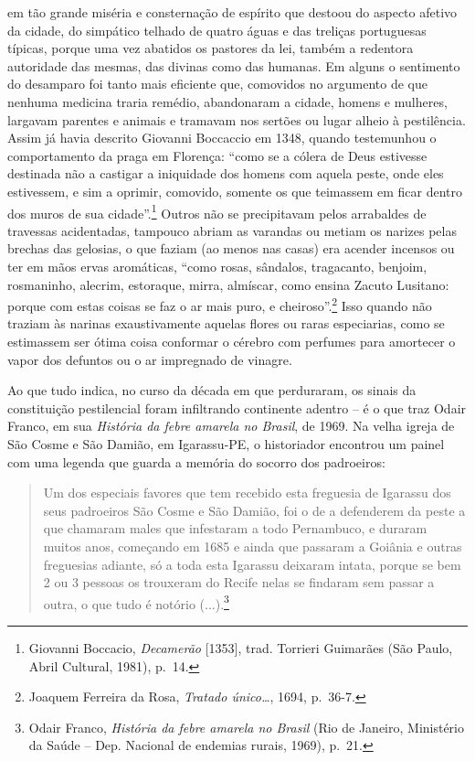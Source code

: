 em tão grande miséria e consternação de espírito que destoou do aspecto
afetivo da cidade, do simpático telhado de quatro águas e das treliças
portuguesas típicas, porque uma vez abatidos os pastores da lei, também
a redentora autoridade das mesmas, das divinas como das humanas. Em
alguns o sentimento do desamparo foi tanto mais eficiente que, comovidos
no argumento de que nenhuma medicina traria remédio, abandonaram a
cidade, homens e mulheres, largavam parentes e animais e tramavam nos
sertões ou lugar alheio à pestilência. Assim já havia descrito Giovanni
Boccaccio em 1348, quando testemunhou o comportamento da praga em
Florença: ``como se a cólera de Deus estivesse destinada não a castigar
a iniquidade dos homens com aquela peste, onde eles estivessem, e sim a
oprimir, comovido, somente os que teimassem em ficar dentro dos muros de
sua cidade''.\footnote{Giovanni Boccacio, \emph{Decamerão} {[}1353{]},
  trad. Torrieri Guimarães (São Paulo, Abril Cultural, 1981), p.~14.}
Outros não se precipitavam pelos arrabaldes de travessas acidentadas,
tampouco abriam as varandas ou metiam os narizes pelas brechas das
gelosias, o que faziam (ao menos nas casas) era acender incensos ou ter
em mãos ervas aromáticas, ``como rosas, sândalos, tragacanto, benjoim,
rosmaninho, alecrim, estoraque, mirra, almíscar, como ensina Zacuto
Lusitano: porque com estas coisas se faz o ar mais puro, e
cheiroso''.\footnote{Joaquem Ferreira da Rosa, \emph{Tratado
  único\ldots{}}, 1694, p.~36-7.} Isso quando não traziam às narinas
exaustivamente aquelas flores ou raras especiarias, como se estimassem
ser ótima coisa conformar o cérebro com perfumes para amortecer o vapor
dos defuntos ou o ar impregnado de vinagre.

Ao que tudo indica, no curso da década em que perduraram, os sinais da
constituição pestilencial foram infiltrando continente adentro -- é o
que traz Odair Franco, em sua \emph{História da febre amarela no
Brasil}, de 1969. Na velha igreja de São Cosme e São Damião, em
Igarassu-PE, o historiador encontrou um painel com uma legenda que
guarda a memória do socorro dos padroeiros:

\begin{quote}
Um dos especiais favores que tem recebido esta freguesia de Igarassu dos
seus padroeiros São Cosme e São Damião, foi o de a defenderem da peste a
que chamaram males que infestaram a todo Pernambuco, e duraram muitos
anos, começando em 1685 e ainda que passaram a Goiânia e outras
freguesias adiante, só a toda esta Igarassu deixaram intata, porque se
bem 2 ou 3 pessoas os trouxeram do Recife nelas se findaram sem passar a
outra, o que tudo é notório (...).\footnote{Odair Franco, \emph{História
  da febre amarela no Brasil} (Rio de Janeiro, Ministério da Saúde --
  Dep. Nacional de endemias rurais, 1969), p.~21.}
\end{quote}

